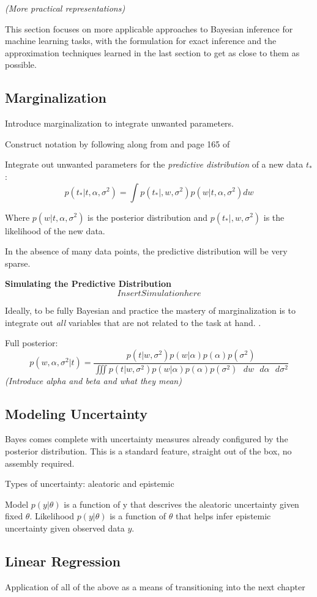 \textit{(More practical representations)}

This section focuses on more applicable approaches to Bayesian inference for machine learning tasks, with the formulation for exact inference and the approximation techniques learned in the last section to get as close to them as possible.

\subsection{Marginalization}

Introduce marginalization to integrate unwanted parameters.

Construct notation by following along from 
\cite{tipping2004bayesian} and page 165 of \cite{bishop2006pattern}

Integrate out unwanted parameters for the \textit{predictive distribution} of a new data $t_*$:
$$
p(t_*|t,\alpha,\sigma^2) = \int p(t_*|,w,\sigma^2) p(w|t,\alpha,\sigma^2) dw
$$

Where  $p(w|t,\alpha,\sigma^2)$ is the posterior distribution and $p(t_*|,w,\sigma^2)$ is the likelihood of the new data.


In the absence of many data points, the predictive distribution will be very sparse. \cite{tipping2004bayesian}

\textbf{Simulating the Predictive Distribution}
$$
Insert Simulationhere
$$


Ideally, to be fully Bayesian and practice the mastery of marginalization is to integrate out \textit{all} variables that are not related to the task at hand. \cite{bishop2006pattern}.

Full posterior:
$$
p(w,\alpha,\sigma^2|t) = \frac{p(t|w,\sigma^2) p(w|\alpha)p(\alpha)p(\sigma^2)}{\iiint p(t|w,\sigma^2)p(w|\alpha)p(\alpha)p(\sigma^2) \text{ } dw \text{ } d\alpha \text{ } d\sigma^2}
$$
\textit{(Introduce alpha and beta and what they mean)}



\subsection{Modeling Uncertainty}

Bayes comes complete with uncertainty measures already configured by the posterior distribution.  This is a standard feature, straight out of the box, no assembly required.

Types of uncertainty: aleatoric and epistemic

Model $p(y|\theta)$ is a function of y that descrives the aleatoric uncertainty given fixed $\theta$.
Likelihood $p(y|\theta)$ is a function of $\theta$ that helps infer epistemic uncertainty given observed data $y$.


\subsection{Linear Regression}

Application of all of the above as a means of transitioning into the next chapter

